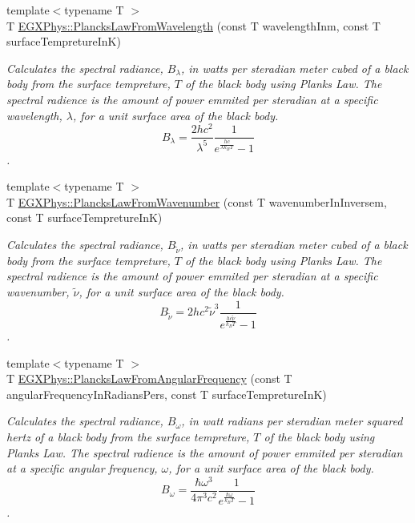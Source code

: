 \begin{DoxyCompactItemize}
{\footnotesize template$<$typename T $>$ }\\T \mbox{\hyperlink{group___e_g_x_phys-_electrodynamics-_black_body-_plancks_law_ga54639bc031ded51ef78aa82b0457a4dd}{E\+G\+X\+Phys\+::\+Plancks\+Law\+From\+Wavelength}} (const T wavelength\+Inm, const T surface\+Tempreture\+InK)
\begin{DoxyCompactList}\small\item\em Calculates the spectral radiance, $B_{\lambda}$, in watts per steradian meter cubed of a black body from the surface tempreture, $T$ of the black body using Plank\textquotesingle{}s Law. The spectral radience is the amount of power emmited per steradian at a specific wavelength, $\lambda$, for a unit surface area of the black body. \[ B_{\lambda} = \dfrac{2 h c^2}{\lambda^5} \dfrac{1}{e^{\frac{hc}{\lambda k_B T}} - 1} \]. \end{DoxyCompactList}\item 
{\footnotesize template$<$typename T $>$ }\\T \mbox{\hyperlink{group___e_g_x_phys-_electrodynamics-_black_body-_plancks_law_ga6648ae2a0fbff6735c1e1a04c7cac746}{E\+G\+X\+Phys\+::\+Plancks\+Law\+From\+Wavenumber}} (const T wavenumber\+In\+Inversem, const T surface\+Tempreture\+InK)
\begin{DoxyCompactList}\small\item\em Calculates the spectral radiance, $B_{\tilde {\nu }}$, in watts per steradian meter cubed of a black body from the surface tempreture, $T$ of the black body using Plank\textquotesingle{}s Law. The spectral radience is the amount of power emmited per steradian at a specific wavenumber, $\tilde {\nu }$, for a unit surface area of the black body. \[ B_{\tilde {\nu }} = 2 h c^2 \tilde {\nu }^3 \dfrac{1}{e^{\frac{hc \tilde {\nu }}{k_B T}} - 1} \]. \end{DoxyCompactList}\item 
{\footnotesize template$<$typename T $>$ }\\T \mbox{\hyperlink{group___e_g_x_phys-_electrodynamics-_black_body-_plancks_law_gaac540560c71e30c02b91d22e417b5863}{E\+G\+X\+Phys\+::\+Plancks\+Law\+From\+Angular\+Frequency}} (const T angular\+Frequency\+In\+Radians\+Pers, const T surface\+Tempreture\+InK)
\begin{DoxyCompactList}\small\item\em Calculates the spectral radiance, $B_{\omega}$, in watt radians per steradian meter squared hertz of a black body from the surface tempreture, $T$ of the black body using Plank\textquotesingle{}s Law. The spectral radience is the amount of power emmited per steradian at a specific angular frequency, $\omega$, for a unit surface area of the black body. \[ B_{\omega} = \dfrac{\hbar \omega^3}{4\pi^3c^2} \dfrac{1}{e^{\frac{\hbar\omega}{k_B T}} - 1} \]. \end{DoxyCompactList}\item 

\end{DoxyCompactItemize}
